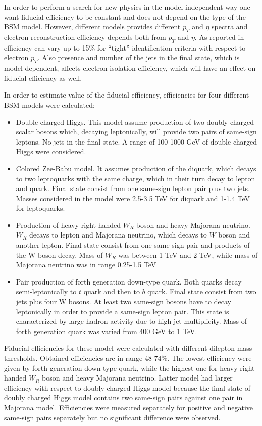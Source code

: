 In order to perform a search for new physics in the model independent way one want fiducial efficiency to be constant and does not depend on the type of the BSM model.
However, different models provides different $p_T$ and $\eta$ spectra and electron reconstruction efficiency depends both from $p_T$ and $\eta$.
As reported in~\cite{electron_tight} efficiency can vary up to 15$\%$ for ``tight'' identification criteria with respect to electron $p_T$.
Also presence and number of the jets in the final state, which is model dependent, affects electron isolation efficiency, which will have an effect on 
fiducial efficiency as well.

In order to estimate value of the fiducial efficiency, efficiencies for four different BSM models were calculated:
\begin{itemize}
 \item Double charged Higgs. This model assume production of two doubly charged scalar bosons which, decaying leptonically, will provide two pairs of same-sign leptons.
 No jets in the final state. A range of 100-1000 GeV of double charged Higgs were considered.
 \item Colored Zee-Babu model. It assumes production of the diquark, which decays to two leptoquarks with the same charge, 
 which in their turn decay to lepton and quark. Final state consist from one same-sign lepton pair plus two jets.
 Masses considered in the model were 2.5-3.5 TeV for diquark and 1-1.4 TeV for leptoquarks.
 \item Production of heavy right-handed $W_R$ boson and heavy Majorana neutrino. $W_R$ decays to lepton and Majorana neutrino, 
 which decays to $W$ boson and another lepton. Final state consist from one same-sign pair and products of the W boson decay.
 Mass of $W_R$ was between 1 TeV and 2 TeV, while mass of Majorana neutrino was in range 0.25-1.5 TeV
 \item Pair production of forth generation down-type quark. Both quarks decay semi-leptonically to $t$ quark and then to $b$ quark.
 Final state consist from two jets plus four W bosons. At least two same-sign bosons have to decay leptonically in order to provide a same-sign lepton pair.
 This state is characterized by large hadron activity due to high jet multiplicity.
 Mass of forth generation quark was varied from 400 GeV to 1 TeV.
\end{itemize}
Fiducial efficiencies for these model were calculated with different dilepton mass thresholds.
Obtained efficiencies are in range 48-74$\%$. The lowest efficiency were given by forth generation down-type quark, while the highest one 
for heavy right-handed $W_R$ boson and heavy Majorana neutrino. Latter model had larger efficiency with respect to doubly charged Higgs model
because the final state of doubly charged Higgs model contains two same-sign pairs against one pair in Majorana model.
Efficiencies were measured separately for positive and negative same-sign pairs separately but no significant difference were observed.

